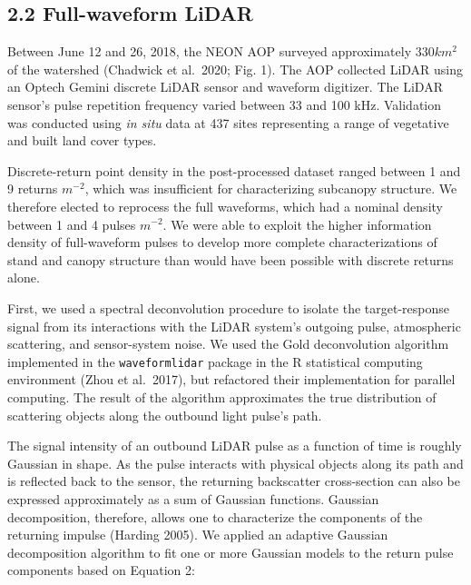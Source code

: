 \documentclass[
  12pt,
]{article}
\begin{document}
\subsection{2.2 Full-waveform LiDAR}\label{full-waveform-lidar}

Between June 12 and 26, 2018, the NEON AOP surveyed approximately
\(330 km^2\) of the watershed (Chadwick et al.~2020; Fig. 1). The AOP
collected LiDAR using an Optech Gemini discrete LiDAR sensor and
waveform digitizer. The LiDAR sensor's pulse repetition frequency varied
between 33 and 100 kHz. Validation was conducted using \emph{in situ}
data at 437 sites representing a range of vegetative and built land
cover types.

Discrete-return point density in the post-processed dataset ranged
between 1 and 9 returns \(m^{-2}\), which was insufficient for
characterizing subcanopy structure. We therefore elected to reprocess
the full waveforms, which had a nominal density between 1 and 4 pulses
\(m^{-2}\). We were able to exploit the higher information density of
full-waveform pulses to develop more complete characterizations of stand
and canopy structure than would have been possible with discrete returns
alone.

First, we used a spectral deconvolution procedure to isolate the
target-response signal from its interactions with the LiDAR system's
outgoing pulse, atmospheric scattering, and sensor-system noise. We used
the Gold deconvolution algorithm implemented in the
\texttt{waveformlidar} package in the R statistical computing
environment (Zhou et al.~2017), but refactored their implementation for
parallel computing. The result of the algorithm approximates the true
distribution of scattering objects along the outbound light pulse's
path.

The signal intensity of an outbound LiDAR pulse as a function of time is
roughly Gaussian in shape. As the pulse interacts with physical objects
along its path and is reflected back to the sensor, the returning
backscatter cross-section can also be expressed approximately as a sum
of Gaussian functions. Gaussian decomposition, therefore, allows one to
characterize the components of the returning impulse (Harding 2005). We
applied an adaptive Gaussian decomposition algorithm to fit one or more
Gaussian models to the return pulse components based on Equation 2:
\end{document}
